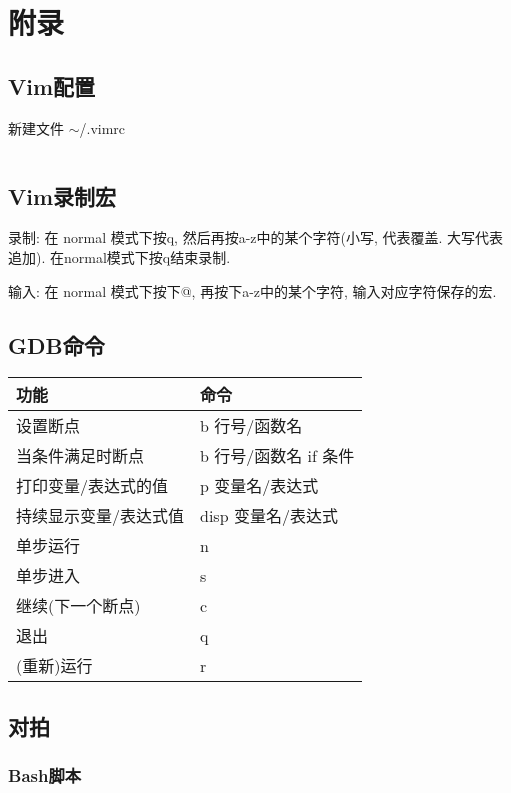 \documentclass[utf8]{ctexart}
\begin{document}
\newpage

\section{附录}

\subsection{Vim配置}

新建文件 $\sim$/.vimrc

\inputminted[linenos,breaklines,tabsize=4,mathescape,texcl]{c}{codes/vimrc}

\subsection{Vim录制宏}

录制: 在 normal 模式下按q, 然后再按a-z中的某个字符(小写, 代表覆盖. 大写代表追加). 在normal模式下按q结束录制.

输入: 在 normal 模式下按下@, 再按下a-z中的某个字符, 输入对应字符保存的宏.

\subsection{GDB命令}

\begin{tabular}{ |l|l| }
	\hline
	\bfseries{功能}		& \bfseries{命令}		\\
	\hline
	设置断点				& b 行号/函数名			\\
	当条件满足时断点		& b 行号/函数名 if 条件	\\
	打印变量/表达式的值	& p 变量名/表达式			\\
	持续显示变量/表达式值	& disp 变量名/表达式		\\
	单步运行				& n						\\
	单步进入				& s						\\
	继续(下一个断点)		& c						\\
	退出					& q						\\
	(重新)运行			& r 					\\
	\hline
\end{tabular}

\subsection{对拍}

\subsubsection{Bash脚本}
\end{document}

